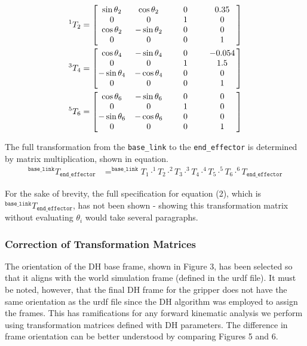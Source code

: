 \documentclass[a4paper]{article}
\newcommand\w[1]{\makebox[3.4em]{$#1$}}
\begin{document}
\begin{minipage}[t]{0.45\textwidth}
	\begin{align*}
	^1 T_2 &=
	\begin{bmatrix}
	\sin \theta_2	& \cos \theta_2 	& 0		& 0.35\\
	0				& 0					& 1		& 0\\
	\cos \theta_2	& -\sin \theta_2	& 0		& 0\\
	\w0				& \w0				& \w0	& \w1	
	\end{bmatrix}\\
	^3 T_4 &=
	\begin{bmatrix}
	\cos \theta_4	& -\sin \theta_4	& 0		& -0.054\\
	0				& 0					& 1		& 1.5\\
	-\sin \theta_4 	& -\cos \theta_4	& 0		& 0\\
	\w0				& \w0				& \w0	& \w1 
	\end{bmatrix}\\
	^5 T_6 &=
	\begin{bmatrix}
	\cos \theta_6	& -\sin \theta_6	& 0		& 0\\
	0				& 0					& 1		& 0\\
	-\sin \theta_6	& -\cos \theta_6	& 0		& 0\\
	\w0				& \w0				& \w0	& \w1
	\end{bmatrix}
	\end{align*}
\end{minipage}

\vspace{0.5cm}
\normalsize
The full transformation from the \verb|base_link| to the \verb|end_effector| is determined by matrix multiplication, shown in equation.
\begin{align}
	^{\texttt{base\_link}} T_{\texttt{end\_effector}} &= ^{\texttt{base\_link}} T_{1} \cdot ^{1} T_{2} \cdot ^{2} T_{3} \cdot ^{3} T_{4} \cdot ^{4} T_{5} \cdot ^{5} T_{6} \cdot ^{6} T_{\texttt{end\_effector}}
\end{align}

For the sake of brevity, the full specification for equation (2), which is $^\texttt{base\_link} T_\texttt{end\_effector}$, has not been shown - showing this transformation matrix without evaluating $\theta_i$ would take several paragraphs.

\subsubsection{Correction of Transformation Matrices}
The orientation of the DH base frame, shown in Figure 3, has been selected so that it aligns with the world simulation frame (defined in the urdf file). It must be noted, however, that the final DH frame for the gripper does not have the same orientation as the urdf file since the DH algorithm was employed to assign the frames. This has ramifications for any forward kinematic analysis we perform using transformation matrices defined with DH parameters. The difference in frame orientation can be better understood by comparing Figures 5 and 6.
\end{document}
